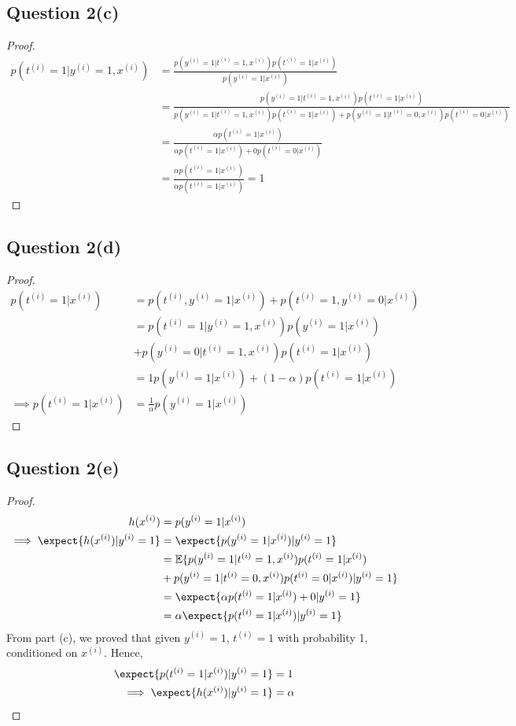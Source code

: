 \documentclass[11pt]{article}
\newcommand{\upi}[0]{^{(i)}}
\begin{document}
	\subsection{Question 2(c)}
	\begin{proof}
		\begin{align}
			p(t\upi=1 | y\upi=1, x\upi) &= \frac{p(y\upi=1|t\upi=1,x\upi)p(t\upi=1|x\upi)}{p(y\upi=1|x\upi)} \\
			&= \frac{
				p(y\upi=1|t\upi=1,x\upi)p(t\upi=1|x\upi)
			}{
				p(y\upi=1|t\upi=1,x\upi)p(t\upi=1|x\upi)
				+ p(y\upi=1|t\upi=0,x\upi)p(t\upi=0|x\upi)
			} \\
			&= \frac{
				\alpha p(t\upi=1|x\upi)
			}{
				\alpha p(t\upi=1|x\upi) + 0p(t\upi=0|x\upi)
			} \\
			&= \frac{
				\alpha p(t\upi=1|x\upi)
			}{
				\alpha p(t\upi=1|x\upi)
			}=1
		\end{align}
	\end{proof}
	
	\newpage
	\subsection{Question 2(d)}
	\begin{proof}
		\begin{align}
			p(t\upi=1|x\upi) &= p(t\upi, y\upi=1|x\upi) + p(t\upi=1, y\upi=0|x\upi) \\
			&= p(t\upi=1|y\upi=1, x\upi) p(y\upi=1|x\upi) \\
			&+ p(y\upi=0|t\upi=1, x\upi) p(t\upi=1|x\upi) \\
			&= 1 p(y\upi=1|x\upi) + (1-\alpha) p(t\upi=1|x\upi) \\
			\implies p(t\upi=1|x\upi) &= \frac{1}{\alpha} p(y\upi=1|x\upi)
		\end{align}
	\end{proof}
	
	\newpage
	\subsection{Question 2(e)}
	\begin{proof}
		\begin{align}
			h(x\upi) &= p(y\upi = 1|x\upi) \\
			\implies \expect{h(x\upi)|y\upi=1} &= \expect{p(y\upi = 1|x\upi)|y\upi=1} \\
			&= \mathbb{E}\{
			p(y\upi = 1|t\upi=1, x\upi) p(t\upi=1|x\upi) \\
			&+ p(y\upi = 1|t\upi=0, x\upi) p(t\upi=0|x\upi)
			|y\upi=1
			\} \\
			&= \expect{\alpha p(t\upi=1|x\upi) + 0|y\upi = 1} \\
			&= \alpha \expect{p(t\upi=1|x\upi)|y\upi=1}
		\end{align}
		From part (c), we proved that given $y\upi=1$, $t\upi=1$ with probability 1, conditioned on $x\upi$. Hence,
		\begin{align}
			\expect{p(t\upi=1|x\upi)|y\upi=1} &= 1 \\
			\implies \expect{h(x\upi)|y\upi=1} &= \alpha
		\end{align}
	\end{proof}
	
\end{document}
